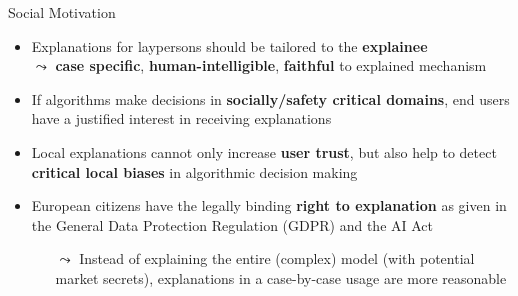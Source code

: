\documentclass[10pt,compress,t,notes=noshow, xcolor=table]{beamer}
\begin{document}
\begin{frame}[t]{Social Motivation}

	\begin{itemize}
		\item Explanations for laypersons should be tailored to the \textbf{explainee}\\ %
		$\leadsto$ \textbf{case specific}, \textbf{human-intelligible}, \textbf{faithful} to explained mechanism
		\pause
		\item If algorithms make decisions in \textbf{socially/safety critical domains}, end users have a justified interest in receiving explanations
		\pause
		\item Local explanations cannot only increase \textbf{user trust}, but also help to detect \textbf{critical local biases} in algorithmic decision making
		\pause
		\item European citizens have the legally binding \textbf{right to explanation} as given in the General Data Protection Regulation (GDPR) and the AI Act
		\begin{itemize}
		    \item[$\leadsto$] Instead of explaining the entire (complex) model (with potential market secrets), explanations in a case-by-case usage are more reasonable
		\end{itemize}

	\end{itemize}
\end{frame}
\end{document}
